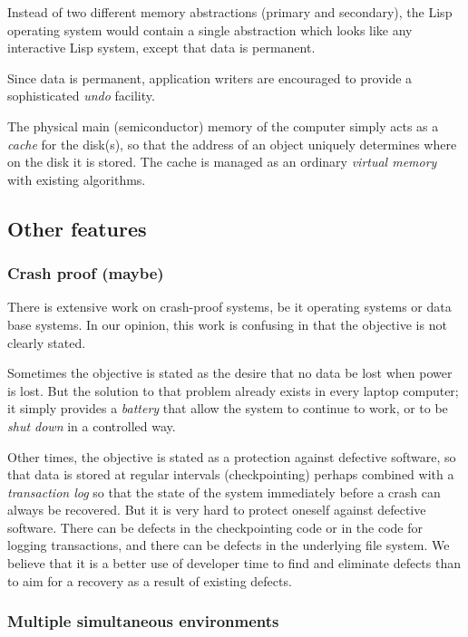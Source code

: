 Instead of two different memory abstractions (primary and
secondary), the Lisp operating system would contain a single
abstraction which looks like any interactive Lisp system, except
that data is permanent.

Since data is permanent, application writers are encouraged to
provide a sophisticated \emph{undo} facility.  

The physical main (semiconductor) memory of the computer simply acts
as a \emph{cache} for the disk(s), so that the address of an object
uniquely determines where on the disk it is stored.  The cache is
managed as an ordinary \emph{virtual memory} with existing
algorithms. 

\subsection{Other features}

\subsubsection{Crash proof (maybe)}

There is extensive work on crash-proof systems, be it operating
systems or data base systems.  In our opinion, this work is
confusing in that the objective is not clearly stated.

Sometimes the objective is stated as the desire that no data be lost
when power is lost.  But the solution to that problem already exists
in every laptop computer; it simply provides a \emph{battery} that
allow the system to continue to work, or to be \emph{shut down} in a
controlled way. 

Other times, the objective is stated as a protection against
defective software, so that data is stored at regular intervals
(checkpointing) perhaps combined with a \emph{transaction log} so
that the state of the system immediately before a crash can always
be recovered.  But it is very hard to protect oneself against
defective software.  There can be defects in the checkpointing code
or in the code for logging transactions, and there can be defects in
the underlying file system.  We believe that it is a better use of
developer time to find and eliminate defects than to aim for a
recovery as a result of existing defects.

\subsubsection{Multiple simultaneous environments}

